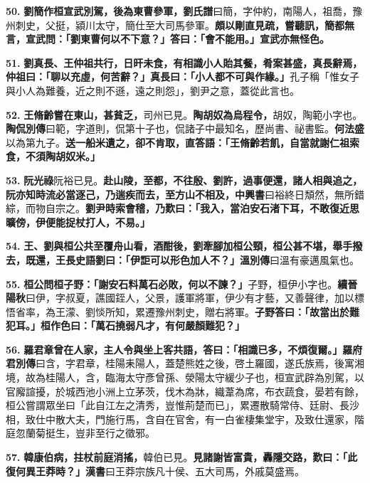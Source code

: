 \textbf{50.} \textbf{劉簡作桓宣武別駕，後為東曹參軍，}{\footnotesize \textbf{劉氏譜}曰簡，字仲約，南陽人，祖喬，豫州刺史，父挺，潁川太守，簡仕至大司馬參軍。}\textbf{頗以剛直見疏，嘗聽訊，簡都無言，宣武問：「劉東曹何以不下意？」答曰：「會不能用。」宣武亦無怪色。}

\textbf{51.} \textbf{劉真長、王仲祖共行，日旰未食，有相識小人貽其餐，肴案甚盛，真長辭焉，仲祖曰：「聊以充虛，何苦辭？」真長曰：「小人都不可與作緣。」}{\footnotesize 孔子稱「惟女子與小人為難養，近之則不遜，遠之則怨」，劉尹之意，蓋從此言也。}

\textbf{52.} \textbf{王脩齡嘗在東山，甚貧乏，}{\footnotesize 司州已見。}\textbf{陶胡奴為烏程令，}{\footnotesize 胡奴，陶範小字也。\textbf{陶侃別傳}曰範，字道則，侃第十子也，侃諸子中最知名，歷尚書、祕書監。\textbf{何法盛}以為第九子。}\textbf{送一船米遺之，卻不肯取，直答語：「王脩齡若飢，自當就謝仁祖索食，不須陶胡奴米。」}

\textbf{53.} \textbf{阮光祿}{\footnotesize 阮裕已見。}\textbf{赴山陵，至都，不往殷、劉許，過事便還，諸人相與追之，阮亦知時流必當逐己，乃遄疾而去，至方山不相及，}{\footnotesize \textbf{中興書}曰裕終日頽然，無所錯綜，而物自宗之。}\textbf{劉尹時索會稽，乃歎曰：「我入，當泊安石渚下耳，不敢復近思曠傍，伊便能捉杖打人，不易。」}

\textbf{54.} \textbf{王、劉與桓公共至覆舟山看，酒酣後，劉牽腳加桓公頸，桓公甚不堪，舉手撥去，既還，王長史語劉曰：「伊詎可以形色加人不？」}{\footnotesize \textbf{溫別傳}曰溫有豪邁風氣也。}

\textbf{55.} \textbf{桓公問桓子野：「謝安石料萬石必敗，何以不諫？」}{\footnotesize 子野，桓伊小字也。\textbf{續晉陽秋}曰伊，字叔夏，譙國銍人，父景，護軍將軍，伊少有才藝，又善聲律，加以標悟省率，為王濛、劉惔所知，累遷豫州刺史，贈右將軍。}\textbf{子野答曰：「故當出於難犯耳。」桓作色曰：「萬石撓弱凡才，有何嚴顏難犯？」}

\textbf{56.} \textbf{羅君章曾在人家，主人令與坐上客共語，答曰：「相識已多，不煩復爾。」}{\footnotesize \textbf{羅府君別傳}曰含，字君章，桂陽耒陽人，蓋楚熊姓之後，啓土羅國，遂氏族焉，後寓湘境，故為桂陽人，含，臨海太守彥曾孫、滎陽太守緩少子也，桓宣武辟為別駕，以官廨諠擾，於城西池小洲上立茅茨，伐木為牀，織葦為席，布衣蔬食，晏若有餘，桓公嘗謂眾坐曰「此自江左之清秀，豈惟荊楚而已」，累遷散騎常侍、廷尉、長沙相，致仕中散大夫，門施行馬，含自在官舍，有一白雀棲集堂宇，及致仕還家，階庭忽蘭菊挺生，豈非至行之徵邪。}

\textbf{57.} \textbf{韓康伯病，拄杖前庭消搖，}{\footnotesize 韓伯已見。}\textbf{見諸謝皆富貴，轟隱交路，歎曰：「此復何異王莽時？」}{\footnotesize \textbf{漢書}曰王莽宗族凡十侯、五大司馬，外戚莫盛焉。}

